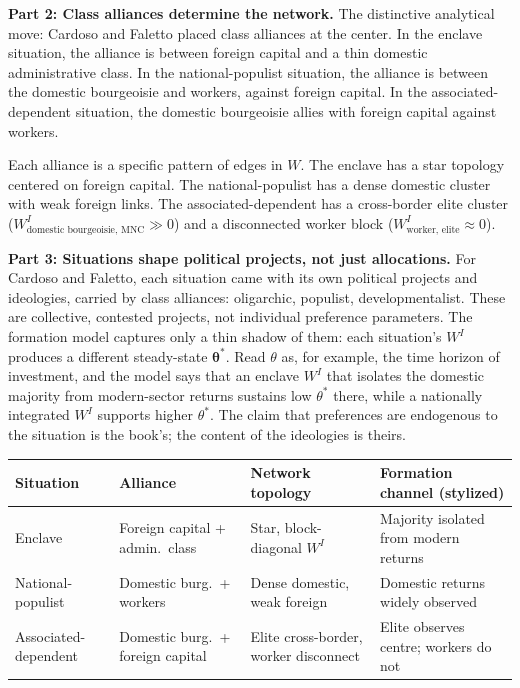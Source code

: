 \documentclass[../structural_economics_book.tex]{subfiles}
\begin{document}
\textbf{Part 2: Class alliances determine the network.} The distinctive analytical move: Cardoso and Faletto placed class alliances at the center. In the enclave situation, the alliance is between foreign capital and a thin domestic administrative class. In the national-populist situation, the alliance is between the domestic bourgeoisie and workers, against foreign capital. In the associated-dependent situation, the domestic bourgeoisie allies with foreign capital against workers.

Each alliance is a specific pattern of edges in $W$. The enclave has a star topology centered on foreign capital. The national-populist has a dense domestic cluster with weak foreign links. The associated-dependent has a cross-border elite cluster ($W^I_{\text{domestic bourgeoisie, MNC}} \gg 0$) and a disconnected worker block ($W^I_{\text{worker, elite}} \approx 0$).

\textbf{Part 3: Situations shape political projects, not just allocations.} For Cardoso and Faletto, each situation came with its own political projects and ideologies, carried by class alliances: oligarchic, populist, developmentalist. These are collective, contested projects, not individual preference parameters. The formation model captures only a thin shadow of them: each situation's $W^I$ produces a different steady-state $\boldsymbol{\theta}^*$. Read $\theta$ as, for example, the time horizon of investment, and the model says that an enclave $W^I$ that isolates the domestic majority from modern-sector returns sustains low $\theta^*$ there, while a nationally integrated $W^I$ supports higher $\theta^*$. The claim that preferences are endogenous to the situation is the book's; the content of the ideologies is theirs.

\begin{center}
\begin{tabularx}{\textwidth}{LLLL}
\toprule
\textbf{Situation} & \textbf{Alliance} & \textbf{Network topology} & \textbf{Formation channel (stylized)} \\
\midrule
Enclave & Foreign capital + admin.\ class & Star, block-diagonal $W^I$ & Majority isolated from modern returns \\
National-populist & Domestic burg.\ + workers & Dense domestic, weak foreign & Domestic returns widely observed \\
Associated-dependent & Domestic burg.\ + foreign capital & Elite cross-border, worker disconnect & Elite observes centre; workers do not \\
\bottomrule
\end{tabularx}
\end{center}
\end{document}
